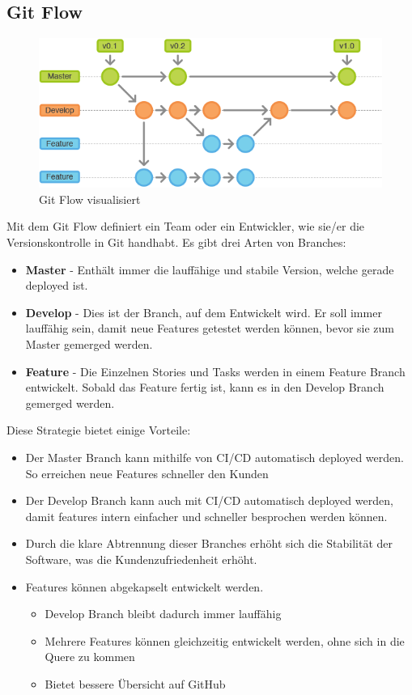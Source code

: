\subsection{Git Flow}
\begin{figure}[!ht]
  \centering
  \includegraphics[width=0.8\linewidth]{./images/Gitflow-Workflow-2.png}
  \caption[\href{https://blog.ordix.de/welches-vorgehen-eignet-sich-fuer-mein-projekt}{Grafik, welche den Git Flow arbeitsablauf visualisiert}]{Git Flow visualisiert}
  \label{fig:git-flow}
\end{figure}
Mit dem Git Flow definiert ein Team oder ein Entwickler, wie sie/er die Versionskontrolle in Git handhabt. Es gibt drei Arten von Branches:
\begin{itemize}
  \item \textbf{Master} - Enthält immer die lauffähige und stabile Version, welche gerade deployed ist.
  \item \textbf{Develop} - Dies ist der Branch, auf dem Entwickelt wird. Er soll immer lauffähig sein, damit neue Features getestet werden können, bevor sie zum Master gemerged werden.
  \item \textbf{Feature} - Die Einzelnen Stories und Tasks werden in einem Feature Branch entwickelt. Sobald das Feature fertig ist, kann es in den Develop Branch gemerged werden.
\end{itemize}
Diese Strategie bietet einige Vorteile:
\begin{itemize}
  \item Der Master Branch kann mithilfe von CI/CD automatisch deployed werden. So erreichen neue Features schneller den Kunden
  \item Der Develop Branch kann auch mit CI/CD automatisch deployed werden, damit features intern einfacher und schneller besprochen werden können.
  \item Durch die klare Abtrennung dieser Branches erhöht sich die Stabilität der Software, was die Kundenzufriedenheit erhöht.
  \item Features können abgekapselt entwickelt werden.
  \begin{itemize}
    \item Develop Branch bleibt dadurch immer lauffähig
    \item Mehrere Features können gleichzeitig entwickelt werden, ohne sich in die Quere zu kommen
    \item Bietet bessere Übersicht auf GitHub
  \end{itemize}
\end{itemize}
